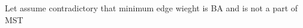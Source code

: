 \documentclass[preview]{standalone}
\begin{document}
\begin{center}
Let assume contradictory that minimum edge wieght  is BA and is not a part of MST
\end{center}
\end{document}
